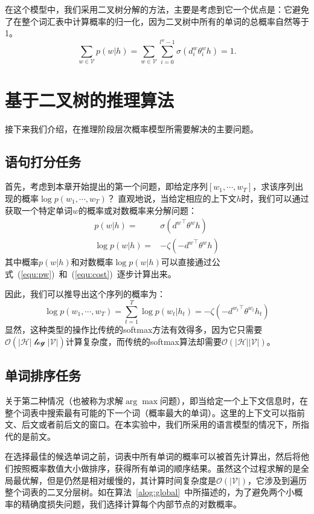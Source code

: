 在这个模型中，我们采用二叉树分解的方法，主要是考虑到它一个优点是：它避免了在整个词汇表中计算概率的归一化，因为二叉树中所有的单词的总概率自然等于1。
\begin{equation}
\sum_{w\in \mathcal{V}}{p(w|h)}=\sum_{w \in \mathcal{V}}\sum_{i=0}^{l^w-1}{\sigma(d_i^w\theta_{i}^w h)}=1.
\end{equation}



\section{基于二叉树的推理算法}
接下来我们介绍，在推理阶段层次概率模型所需要解决的主要问题。
\subsection{语句打分任务}
首先，考虑到本章开始提出的第一个问题，即给定序列$ [w_1,\cdots,w_T] $，求该序列出现的概率$   \log p(w_1,\cdots, w_T)$？ 直观地说，当给定相应的上下文$ h $时，我们可以通过获取一个特定单词$ w $的概率或对数概率来分解问题：
\begin{equation}
\begin{split}
    p(w|h) =&\sigma({d^w}^\top \theta^w h)\\
   \log p(w|h) =& -\zeta(- {d^{w}}^\top \theta^{w} h )
\end{split}
\end{equation}
其中概率$ p(w|h)$和对数概率$\log p(w | h)$可以直接通过公式~(\ref{equ:pw})~和~(\ref{equ:cost})~逐步计算出来。

因此，我们可以推导出这个序列的概率为：
\begin{equation}
   \log p(w_1,\cdots, w_T)=\sum_{t=1}^T\log p(w_t|h_t) = -\zeta(- {d^{w_t}}^\top \theta^{w_t} h_t )
\end{equation}
显然，这种类型的操作比传统的softmax方法有效得多，因为它只需要$\mathcal{O}(\mathcal {| H | \log| V |})$计算复杂度，而传统的softmax算法却需要$\mathcal{O}(\mathcal {|H||V|})$。

\subsection{单词排序任务}
关于第二种情况（也被称为求解$\arg\max$问题），即当给定一个上下文信息时，在整个词表中搜索最有可能的下一个词（概率最大的单词）。这里的上下文可以指前文、后文或者前后文的窗口。在本实验中，我们所采用的语言模型的情况下，所指代的是前文。

在选择最佳的候选单词之前，词表中所有单词的概率可以被首先计算出，然后将他们按照概率数值大小做排序，获得所有单词的顺序结果。虽然这个过程求解的是全局最优解，但是仍然是相对缓慢的，其计算时间复杂度是$\mathcal{O}(\mathcal{|V|})$，它涉及到遍历整个词表的二叉分层树。如在算法~\ref{alog:global}~中所描述的，为了避免两个小概率的精确度损失问题，我们选择计算每个内部节点的对数概率。


